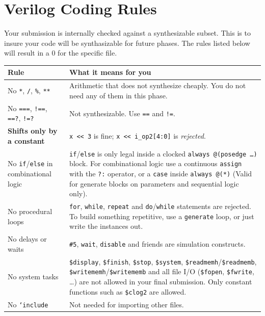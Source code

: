 \documentclass[11pt]{article}
\begin{document}
\section{Verilog Coding Rules}
\label{sec:rules}
Your submission is internally checked against a synthesizable subset. This is to insure your code will be synthasizable for future phases. The rules listed below will result in a 0 for the specific file.

\begin{center}
\begin{tabular}{@{}p{5.4cm}p{8.8cm}@{}}
\toprule
\textbf{Rule} & \textbf{What it means for you} \\
\midrule
No \texttt{*}, \texttt{/}, \texttt{\%}, \texttt{**}
  & Arithmetic that does not synthesize cheaply. You do not need any of them
    in this phase. \\
No \texttt{===}, \texttt{!==}, \texttt{==?}, \texttt{!=?}
  & Not synthesizable. Use \texttt{==} and \texttt{!=}. \\
\textbf{Shifts only by a constant}
  & \texttt{x << 3} is fine; \texttt{x << i\_op2[4:0]} is \emph{rejected}. \\
No \texttt{if}/\texttt{else} in combinational logic
  & \texttt{if}/\texttt{else} is only legal inside a clocked
    \texttt{always @(posedge \dots)} block. For combinational logic use a
    continuous \texttt{assign} with the \texttt{?:} operator, or a
    \texttt{case} inside \texttt{always @(*)} (Valid for generate blocks on parameters and sequential logic only). \\
No procedural loops
  & \texttt{for}, \texttt{while}, \texttt{repeat} and \texttt{do}/\texttt{while}
    statements are rejected. To build something repetitive, use a
    \texttt{generate} loop, or just write the instances out. \\
No delays or waits
  & \texttt{\#5}, \texttt{wait}, \texttt{disable} and friends are simulation
    constructs. \\
No system tasks
  & \texttt{\$display}, \texttt{\$finish}, \texttt{\$stop}, \texttt{\$system},
    \texttt{\$readmemh}/\texttt{\$readmemb},
    \texttt{\$writememh}/\texttt{\$writememb} and all file I/O
    (\texttt{\$fopen}, \texttt{\$fwrite}, \dots) are not allowed in your final submission. Only
    constant functions such as \texttt{\$clog2} are allowed. \\
No \texttt{`include}
  & Not needed for importing other files. \\
\bottomrule
\end{tabular}
\end{center}
\end{document}
